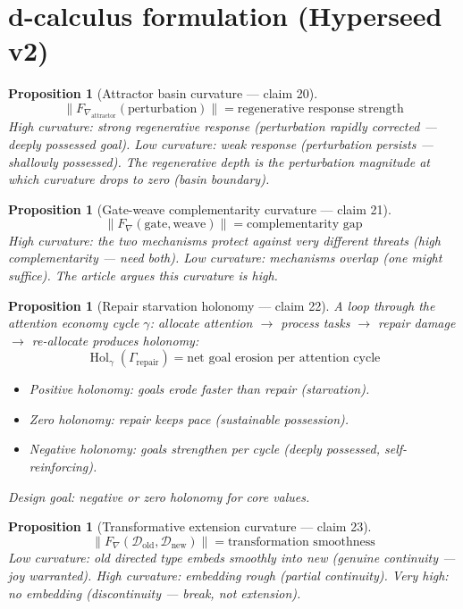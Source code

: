 \documentclass[11pt,a4paper]{article}
\newtheorem{proposition}[definition]{Proposition}
\begin{document}
\section{d-calculus formulation (Hyperseed v2)}

\begin{proposition}[Attractor basin curvature --- claim 20]
\label{prop:basin_curv}
\[
  \|F_{\nabla_{\text{attractor}}}(\text{perturbation})\| =
    \text{regenerative response strength}
\]
High curvature: strong regenerative response (perturbation rapidly
corrected --- deeply possessed goal). Low curvature: weak response
(perturbation persists --- shallowly possessed). The regenerative
depth is the perturbation magnitude at which curvature drops to zero
(basin boundary).
\end{proposition}

\begin{proposition}[Gate-weave complementarity curvature --- claim 21]
\label{prop:gw_curv}
\[
  \|F_\nabla(\text{gate}, \text{weave})\| = \text{complementarity gap}
\]
High curvature: the two mechanisms protect against very different threats
(high complementarity --- need both). Low curvature: mechanisms overlap
(one might suffice). The article argues this curvature is high.
\end{proposition}

\begin{proposition}[Repair starvation holonomy --- claim 22]
\label{prop:repair_hol}
A loop through the attention economy cycle $\gamma$: allocate attention
$\to$ process tasks $\to$ repair damage $\to$ re-allocate produces
holonomy:
\[
  \operatorname{Hol}_\gamma(\Gamma_{\text{repair}}) = \text{net goal
    erosion per attention cycle}
\]
\begin{itemize}
  \item Positive holonomy: goals erode faster than repair (starvation).
  \item Zero holonomy: repair keeps pace (sustainable possession).
  \item Negative holonomy: goals strengthen per cycle (deeply possessed,
    self-reinforcing).
\end{itemize}
Design goal: negative or zero holonomy for core values.
\end{proposition}

\begin{proposition}[Transformative extension curvature --- claim 23]
\label{prop:trans_curv}
\[
  \|F_\nabla(\mathcal{D}_{\text{old}}, \mathcal{D}_{\text{new}})\| =
    \text{transformation smoothness}
\]
Low curvature: old directed type embeds smoothly into new (genuine
continuity --- joy warranted). High curvature: embedding rough (partial
continuity). Very high: no embedding (discontinuity --- break, not
extension).
\end{proposition}
\end{document}
